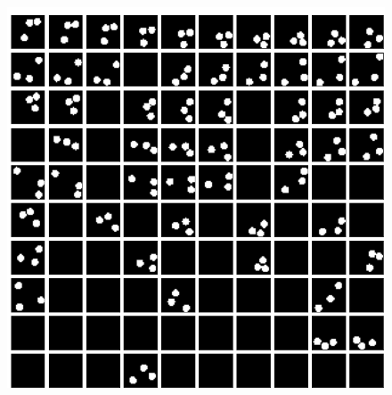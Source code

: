 \begin{frame}
\begin{figure}[h!]
	\begin{minipage}{0.32\textwidth}
		\center
		\includegraphics[scale=0.12]{Bilder/bouncingBalls_VAE}
	\end{minipage}
	\begin{minipage}{0.32\textwidth}
		\hfill
	\end{minipage}
	\begin{minipage}{0.32\textwidth}
		\hfill
	\end{minipage}
\end{figure}

\end{frame}


